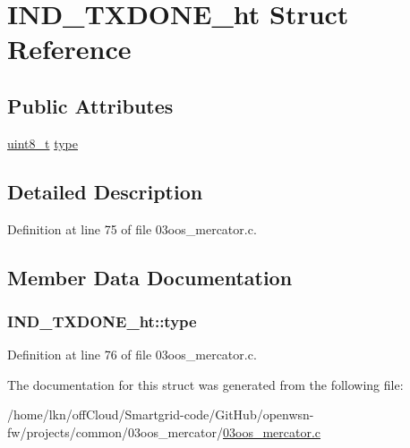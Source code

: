 \hypertarget{struct_i_n_d___t_x_d_o_n_e__ht}{}\section{I\+N\+D\+\_\+\+T\+X\+D\+O\+N\+E\+\_\+ht Struct Reference}
\label{struct_i_n_d___t_x_d_o_n_e__ht}
\subsection*{Public Attributes}
\begin{DoxyCompactItemize}
\item 
\hyperlink{_p_e___types_8h_aba7bc1797add20fe3efdf37ced1182c5}{uint8\+\_\+t} \hyperlink{struct_i_n_d___t_x_d_o_n_e__ht_aa9b20d2582e40fdc952cddae5fe15a1e}{type}
\end{DoxyCompactItemize}


\subsection{Detailed Description}


Definition at line 75 of file 03oos\+\_\+mercator.\+c.



\subsection{Member Data Documentation}
\subsubsection[{\texorpdfstring{type}{type}}]{ I\+N\+D\+\_\+\+T\+X\+D\+O\+N\+E\+\_\+ht\+::type}\hypertarget{struct_i_n_d___t_x_d_o_n_e__ht_aa9b20d2582e40fdc952cddae5fe15a1e}{}\label{struct_i_n_d___t_x_d_o_n_e__ht_aa9b20d2582e40fdc952cddae5fe15a1e}


Definition at line 76 of file 03oos\+\_\+mercator.\+c.



The documentation for this struct was generated from the following file\+:\begin{DoxyCompactItemize}
\item 
/home/lkn/off\+Cloud/\+Smartgrid-\/code/\+Git\+Hub/openwsn-\/fw/projects/common/03oos\+\_\+mercator/\hyperlink{03oos__mercator_8c}{03oos\+\_\+mercator.\+c}\end{DoxyCompactItemize}
